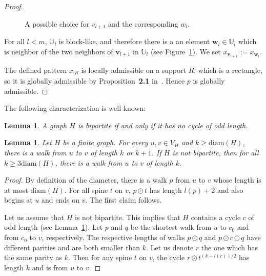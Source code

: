 \documentclass{article}
\newtheorem{lemma}[theorem]{Lemma}
\begin{document}
\begin{proof}
\begin{figure}
\begin{center}
    \end{center}
    \caption{\label{fig:growrectangle}A possible choice for $v_{l+1}$ and the corresponding $w_l$.}
\end{figure}

For all $l<m$, $\mathbb{U}_l$ is block-like, and therefore  there is a an element $\textbf{w}_l \in \mathbb{U}_l$ which is neighbor of the two neighbors of $\textbf{v}_{l+1}$ in $\mathbb{U}_l$ (see Figure~\ref{fig:growrectangle}). We set $x_{\textbf{v}_{l+1}} := x_{\textbf{w}_l}$. 

The defined pattern $x_{|R}$ is locally admissible on a support $R$, which is a rectangle, so it is globally admissible by Proposition~\textbf{2.1} in~\cite{CM18}. Hence $p$ is globally admissible. 
\end{proof}

The following characterization is well-known:

\begin{lemma}\label{lem:bipartite}
	A graph $H$ is bipartite if and only if it has no cycle of odd length. 
\end{lemma}

\begin{lemma}\label{lem:mixingbipartite}
Let $H$ be a finite graph. For every $u,v \in V_H$ and $k\geq \textrm{diam}(H)$, there is a walk from $u$ to $v$ of length $k$ or $k+1$. If $H$ is not bipartite, then for all $k\geq 3\textrm{diam}(H)$, there is a walk  from $u$ to $v$ of length $k$.
\end{lemma} 

\begin{proof}
By definition of the diameter, there is a walk $p$ from $u$ to $v$ whose length is at most $\textrm{diam}(H)$. For all spine $t$ on $v$, $p \odot t$ has length $l(p)+2$ and also begins at $u$ and ends on $v$. The first claim follows.

Let us assume that $H$ is not bipartite. 
This implies that $H$ contains a cycle $c$ of odd length (see Lemma~\ref{lem:bipartite}). Let $p$ and $q$ be the shortest walk from $u$ to $c_0$ and from $c_0$ to $v$, respectively. The respective lengths of walks $p \odot q$ and $p \odot c \odot q$ have different parities and are both smaller than $k$. Let us denote $r$ the one which has the same parity as $k$. Then for any spine $t$ on $v$, the cycle $r \odot t^{(k-l(r))/2}$ 
has length $k$ and is from $u$ to $v$. \end{proof}
\end{document}
